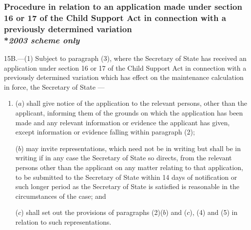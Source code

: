 \documentclass[12pt,a4paper]{article}
\begin{document}
\subsubsection[15B. Procedure in relation to an application made under section 16 or 17 of the Child Support Act in connection with a previously determined variation]{Procedure in relation to an application made under section 16 or 17 of the Child Support Act in connection with a previously determined variation\\*\emph{2003 scheme only}}

15B.---(1)  Subject to paragraph (3), where the 
Secretary of State  %
has received an application under section 16 or 17 of the Child Support Act in connection with a previously determined variation which has effect on the maintenance calculation in force, 
the Secretary of State%
—
\begin{enumerate}\item[]
($a$) shall give notice of the application to the relevant persons, other than the applicant, informing them of the grounds on which the application has been made and any relevant information or evidence the applicant has given, except information or evidence falling within paragraph (2);

($b$) may invite representations, which need not be in writing but shall be in writing if in any case 
the Secretary of State  %
so directs, from the relevant persons other than the applicant on any matter relating to that application, to be submitted to the 
Secretary of State  %
within 14 days of notification or such longer period as the 
Secretary of State  %
is satisfied is reasonable in the circumstances of the case; and

($c$) shall set out the provisions of paragraphs (2)($b$)  and ($c$), (4) and (5) in relation to such representations.
\end{enumerate}
\end{document}
